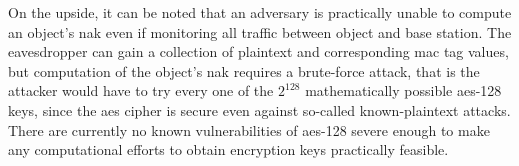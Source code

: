 On the upside, it can be noted that an adversary is practically unable to compute an object's \gls{nak} even if monitoring all traffic between object and base station.
The eavesdropper can gain a collection of plaintext and corresponding \gls{mac} tag values, but computation of the object's \gls{nak} requires a brute-force attack, that is the attacker would have to try every one of the $2^{128}$ mathematically possible \gls{aes}-128 keys, since the \gls{aes} cipher is secure even against so-called known-plaintext attacks.
There are currently no known vulnerabilities of \gls{aes}-128 severe enough to make any computational efforts to obtain encryption keys practically feasible.
